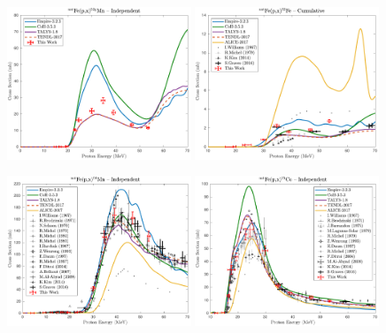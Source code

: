\begin{figure}
 \centering
 \includegraphics[width=0.49\textwidth]{./figures/52gMn.pdf}
 \includegraphics[width=0.49\textwidth]{./figures/52Fe.pdf}
 
 
 \includegraphics[width=0.49\textwidth]{./figures/54Mn.pdf}
 \includegraphics[width=0.49\textwidth]{./figures/55Co.pdf}
 

\end{figure}
